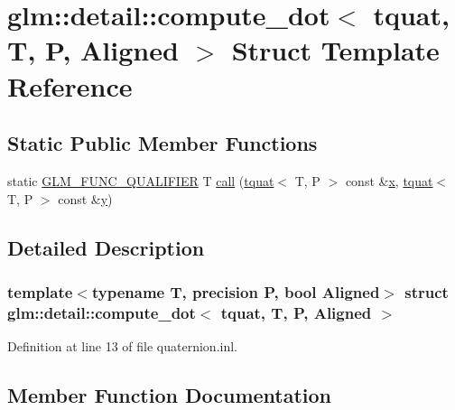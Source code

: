 \hypertarget{structglm_1_1detail_1_1compute__dot_3_01tquat_00_01_t_00_01_p_00_01_aligned_01_4}{}\section{glm\+::detail\+::compute\+\_\+dot$<$ tquat, T, P, Aligned $>$ Struct Template Reference}
\label{structglm_1_1detail_1_1compute__dot_3_01tquat_00_01_t_00_01_p_00_01_aligned_01_4}
\subsection*{Static Public Member Functions}
\begin{DoxyCompactItemize}
\item 
static \mbox{\hyperlink{setup_8hpp_a33fdea6f91c5f834105f7415e2a64407}{G\+L\+M\+\_\+\+F\+U\+N\+C\+\_\+\+Q\+U\+A\+L\+I\+F\+I\+ER}} T \mbox{\hyperlink{structglm_1_1detail_1_1compute__dot_3_01tquat_00_01_t_00_01_p_00_01_aligned_01_4_aba8389412ddb78fa5ee6775625caa21e}{call}} (\mbox{\hyperlink{structglm_1_1tquat}{tquat}}$<$ T, P $>$ const \&\mbox{\hyperlink{glad_8h_a92d0386e5c19fb81ea88c9f99644ab1d}{x}}, \mbox{\hyperlink{structglm_1_1tquat}{tquat}}$<$ T, P $>$ const \&\mbox{\hyperlink{glad_8h_a66ddd433d2cacfe27f5906b7e86faeed}{y}})
\end{DoxyCompactItemize}


\subsection{Detailed Description}
\subsubsection*{template$<$typename T, precision P, bool Aligned$>$\newline
struct glm\+::detail\+::compute\+\_\+dot$<$ tquat, T, P, Aligned $>$}



Definition at line 13 of file quaternion.\+inl.



\subsection{Member Function Documentation}
\mbox{\label{structglm_1_1detail_1_1compute__dot_3_01tquat_00_01_t_00_01_p_00_01_aligned_01_4_aba8389412ddb78fa5ee6775625caa21e}} 
